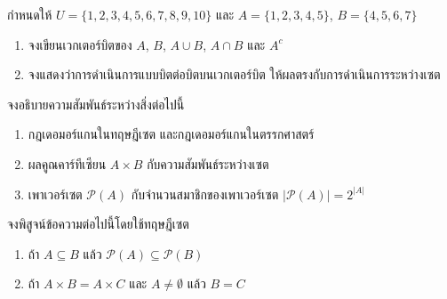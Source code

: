 \begin{exercise}
กำหนดให้ $U = \{1, 2, 3, 4, 5, 6, 7, 8, 9, 10\}$ และ $A = \{1, 2, 3, 4, 5\}$, $B = \{4, 5, 6, 7\}$
\begin{enumerate}
    \item จงเขียนเวกเตอร์บิตของ $A$, $B$, $A \cup B$, $A \cap B$ และ $A^c$
    \item จงแสดงว่าการดำเนินการแบบบิตต่อบิตบนเวกเตอร์บิต ให้ผลตรงกับการดำเนินการระหว่างเซต
\end{enumerate}
\end{exercise}

\begin{exercise}
จงอธิบายความสัมพันธ์ระหว่างสิ่งต่อไปนี้
\begin{enumerate}
    \item กฎเดอมอร์แกนในทฤษฎีเซต และกฎเดอมอร์แกนในตรรกศาสตร์
    \item ผลคูณคาร์ทีเซียน $A \times B$ กับความสัมพันธ์ระหว่างเซต
    \item เพาเวอร์เซต $\mathcal{P}(A)$ กับจำนวนสมาชิกของเพาเวอร์เซต $|\mathcal{P}(A)| = 2^{|A|}$
\end{enumerate}
\end{exercise}

\begin{exercise}
จงพิสูจน์ข้อความต่อไปนี้โดยใช้ทฤษฎีเซต
\begin{enumerate}
    \item ถ้า $A \subseteq B$ แล้ว $\mathcal{P}(A) \subseteq \mathcal{P}(B)$
    \item ถ้า $A \times B = A \times C$ และ $A \neq \emptyset$ แล้ว $B = C$
\end{enumerate}
\end{exercise}


